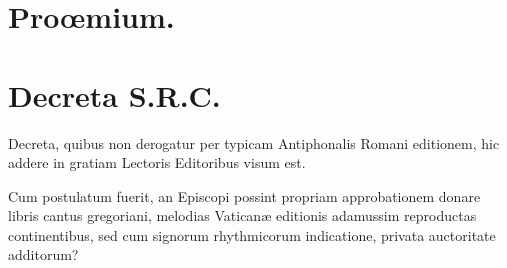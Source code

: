 \documentclass[vesperale_romanum.tex]{subfiles}
\begin{document}
\vspace{\baselineskip}

{}

\vspace*{\fill}


  \makebox[0pt][l]%
  {\phantom{10.}} %

\newpage\null\thispagestyle{empty}

\newpage\null\thispagestyle{empty}\newpage

\frontmatter

\thispagestyle{empty}
\section*{Proœmium.}







\newpage

\section*{Decreta S.R.C.}

\thispagestyle{empty}
Decreta, quibus non derogatur per typicam Antiphonalis Romani editionem, hic addere in gratiam Le\-ctoris Editoribus visum est.

\myrule

{\centering{}\par} %

{}

Cum postulatum fuerit, an Episcopi possint propriam approbationem donare libris cantus gregoriani, melodias Vaticanæ editionis adamussim reprodu\-ctas continentibus, sed cum signorum rhythmicorum indicatione, privata au\-ctoritate additorum?
\end{document}
